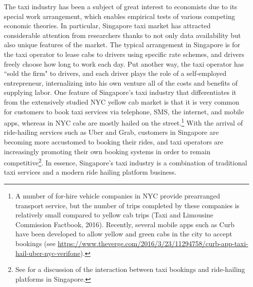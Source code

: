 \documentclass[reviewmode]{restud}
\begin{document}
The taxi industry has been a subject of great interest to economists due to its special work arrangement, which enables empirical tests of various competing economic theories. In particular, Singapore taxi market has attracted considerable attention from researchers \citep{Ho3074,chou2002testing,agarwal2015singaporean,agarwal2017anticipated,agarwal2018fickle} thanks to not only data availability but also unique features of the market. The typical arrangement in Singapore is for the taxi operator to lease cabs to drivers using specific rate schemes, and drivers freely choose how long to work each day. Put another way, the taxi operator has ``sold the firm" to drivers, and each driver plays the role of a self-employed entrepreneur, internalizing into his own venture all of the costs and benefits of supplying labor. One feature of Singapore's taxi industry that differentiates it from the extensively studied NYC yellow cab market is that it is very common for customers to book taxi services via telephone, SMS, the internet, and mobile apps, whereas in NYC cabs are mostly hailed on the street.\footnote{A number of for-hire vehicle companies in NYC provide prearranged transport service, but the number of trips completed by these companies is relatively small compared to yellow cab trips (Taxi and Limousine Commission Factbook, 2016). Recently, several mobile apps such as Curb have been developed to allow yellow and green cabs in the city to accept bookings (see \url{https://www.theverge.com/2016/3/23/11294758/curb-app-taxi-hail-uber-nyc-verifone}).} With the arrival of ride-hailing services such as Uber and Grab, customers in Singapore are becoming more accustomed to booking their rides, and taxi operators are increasingly promoting their own booking systems in order to remain competitive\footnote{See \citet{agarwal2018fickle} for a discussion of the interaction between taxi bookings and ride-hailing platforms in Singapore.}. In essence, Singapore's taxi industry is a combination of traditional taxi services and a modern ride hailing platform business.
\end{document}

